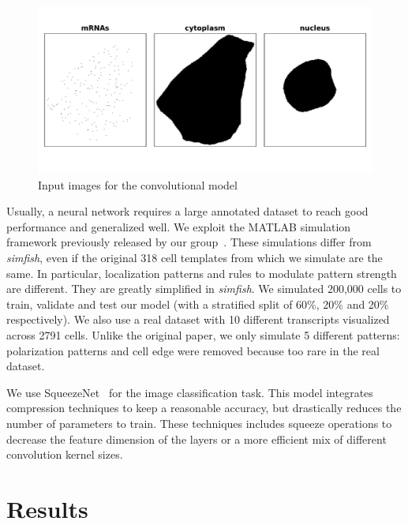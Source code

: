 \begin{figure}[h]
    \centering
    \includegraphics[width=\textwidth]{figures/appendix/surface_layers}
    \caption{Input images for the convolutional model}
    \label{fig:surface_layers}
\end{figure}

Usually, a neural network requires a large annotated dataset to reach good performance and generalized well.
We exploit the MATLAB simulation framework previously released by our group~\cite{samacoits_computational_2018}.
These simulations differ from \emph{simfish}, even if the original 318 cell templates from which we simulate are the same.
In particular, localization patterns and rules to modulate pattern strength are different.
They are greatly simplified in \emph{simfish}.
We simulated 200,000 cells to train, validate and test our model (with a stratified split of 60\%, 20\% and 20\% respectively).
We also use a real dataset with 10 different transcripts visualized across 2791 cells.
Unlike the original paper, we only simulate 5 different patterns: polarization patterns and cell edge were removed because too rare in the real dataset.

We use SqueezeNet~\cite{Iandola_2016} for the image classification task.
This model integrates compression techniques to keep a reasonable accuracy, but drastically reduces the number of parameters to train.
These techniques includes squeeze operations to decrease the feature dimension of the layers or a more efficient mix of different convolution kernel sizes.

\section{Results} \label{sec:results_cnn_features}

